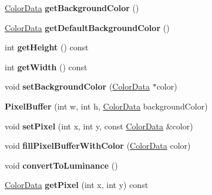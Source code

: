 \begin{DoxyCompactItemize}
\item 
\hypertarget{classPixelBuffer_a7eadc0d458fec5d0e0f502d279b86ea7}{\hyperlink{classColorData}{Color\-Data} {\bfseries get\-Background\-Color} ()}\label{classPixelBuffer_a7eadc0d458fec5d0e0f502d279b86ea7}

\item 
\hypertarget{classPixelBuffer_a36649accdea429915280ba71a7976300}{\hyperlink{classColorData}{Color\-Data} {\bfseries get\-Default\-Background\-Color} ()}\label{classPixelBuffer_a36649accdea429915280ba71a7976300}

\item 
\hypertarget{classPixelBuffer_abd5685a6a23041ed9640da9370eb7839}{int {\bfseries get\-Height} () const }\label{classPixelBuffer_abd5685a6a23041ed9640da9370eb7839}

\item 
\hypertarget{classPixelBuffer_a26dc9286596d27cd416d34611c00602e}{int {\bfseries get\-Width} () const }\label{classPixelBuffer_a26dc9286596d27cd416d34611c00602e}

\item 
\hypertarget{classPixelBuffer_a1838bd976c9c98a79b0c2eb1246b816f}{void {\bfseries set\-Background\-Color} (\hyperlink{classColorData}{Color\-Data} $\ast$color)}\label{classPixelBuffer_a1838bd976c9c98a79b0c2eb1246b816f}

\item 
\hypertarget{classPixelBuffer_ae373904fcdd3c820677b959354b75410}{{\bfseries Pixel\-Buffer} (int w, int h, \hyperlink{classColorData}{Color\-Data} background\-Color)}\label{classPixelBuffer_ae373904fcdd3c820677b959354b75410}

\item 
\hypertarget{classPixelBuffer_abe673364dfceec95783e1dfb00ec9bd1}{void {\bfseries set\-Pixel} (int x, int y, const \hyperlink{classColorData}{Color\-Data} \&color)}\label{classPixelBuffer_abe673364dfceec95783e1dfb00ec9bd1}

\item 
\hypertarget{classPixelBuffer_a1bdab74553ab7d569629a42a808b4785}{void {\bfseries fill\-Pixel\-Buffer\-With\-Color} (\hyperlink{classColorData}{Color\-Data} color)}\label{classPixelBuffer_a1bdab74553ab7d569629a42a808b4785}

\item 
\hypertarget{classPixelBuffer_a73f0518c147ad7900a64b4ffa205b9fc}{void {\bfseries convert\-To\-Luminance} ()}\label{classPixelBuffer_a73f0518c147ad7900a64b4ffa205b9fc}

\item 
\hypertarget{classPixelBuffer_ae01450fb4e9824c1e93e92f4377e9924}{\hyperlink{classColorData}{Color\-Data} {\bfseries get\-Pixel} (int x, int y) const }\label{classPixelBuffer_ae01450fb4e9824c1e93e92f4377e9924}


\end{DoxyCompactItemize}

